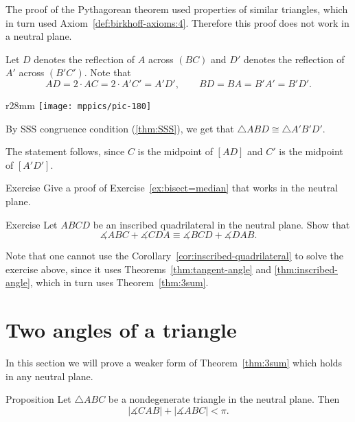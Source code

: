 The proof of the Pythagorean theorem used properties of similar triangles, which in turn used Axiom~\ref{def:birkhoff-axioms:4}. 
Therefore this proof does not work in a neutral plane.

Let $D$ denotes the reflection of $A$ across $(BC)$
and $D'$ denotes the reflection of $A'$ across $(B'C')$.
Note that 
$$
AD=2\cdot AC=2\cdot A'C'=A'D',\qquad
BD=BA=B'A'=B'D'.
$$

{

\begin{wrapfigure}{r}{28mm}
\vskip-0mm
\centering
\texttt{[image: mppics/pic-180]}
\end{wrapfigure}

By SSS congruence condition (\ref{thm:SSS}), 
we get that $\triangle ABD\cong \triangle A'B'D'$.

The statement follows, since $C$ is the midpoint of $[AD]$
and $C'$ is the midpoint of $[A'D']$.  
\qeds

\begin{thm}{Exercise}\label{ex:abs-bisect=median}
Give a proof of Exercise~\ref{ex:bisect=median}
that works in the neutral plane. 
\end{thm}

}

\begin{thm}{Exercise}\label{ex:abs-inscibed}
Let $ABCD$ be an inscribed quadrilateral in the neutral plane.
Show that
$$\measuredangle ABC+\measuredangle CDA\equiv \measuredangle BCD+\measuredangle DAB.$$

\end{thm}

Note that one cannot use the Corollary~\ref{cor:inscribed-quadrilateral} to solve the exercise above,
since it uses Theorems~\ref{thm:tangent-angle} and \ref{thm:inscribed-angle},
which in turn uses Theorem~\ref{thm:3sum}.


\section*{Two angles of a triangle}

In this section we will prove a weaker form of Theorem~\ref{thm:3sum}
which holds in any neutral plane.

\begin{thm}{Proposition}\label{prop:2sum}
Let $\triangle ABC$ be a nondegenerate triangle in the neutral plane.
Then 
$$|\measuredangle CAB|+|\measuredangle ABC|< \pi.$$

\end{thm}

